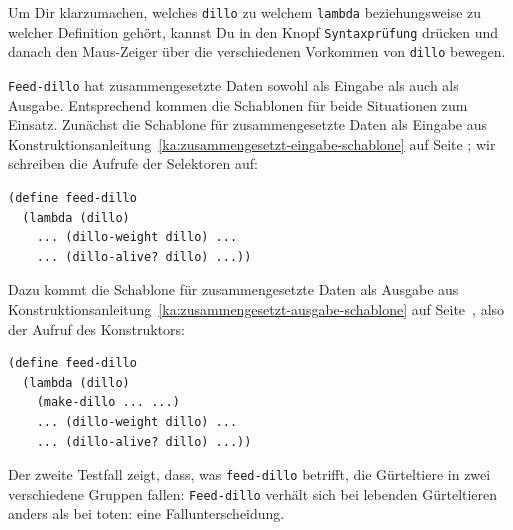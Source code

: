 \begin{aufgabeinline}
  Um Dir klarzumachen, welches \lstinline{dillo} zu welchem
  \lstinline{lambda} beziehungsweise zu welcher Definition gehört, kannst
  Du in \drscheme{} den Knopf \lstinline{Syntaxprüfung} drücken und
  danach den Maus-Zeiger über die verschiedenen Vorkommen von
  \lstinline{dillo} bewegen.
\end{aufgabeinline}
%
\lstinline{Feed-dillo} hat zusammengesetzte Daten sowohl als Eingabe
als auch als Ausgabe.  Entsprechend kommen die Schablonen für beide
Situationen zum Einsatz.  Zunächst die Schablone für zusammengesetzte
Daten als Eingabe aus
Konstruktionsanleitung~\ref{ka:zusammengesetzt-eingabe-schablone} auf
Seite \pageref{ka:zusammengesetzt-eingabe-schablone}; wir schreiben die Aufrufe der Selektoren auf:
%
\begin{lstlisting}
(define feed-dillo
  (lambda (dillo)
    ... (dillo-weight dillo) ...
    ... (dillo-alive? dillo) ...))
\end{lstlisting}
%
Dazu kommt die Schablone für zusammengesetzte Daten als Ausgabe aus
Konstruktionsanleitung~\ref{ka:zusammengesetzt-ausgabe-schablone} auf
Seite~\pageref{ka:zusammengesetzt-ausgabe-schablone}, also
der Aufruf des Konstruktors:
%
\begin{lstlisting}
(define feed-dillo
  (lambda (dillo)
    (make-dillo ... ...)
    ... (dillo-weight dillo) ...
    ... (dillo-alive? dillo) ...))
\end{lstlisting}
%
Der zweite Testfall zeigt, dass, was \lstinline{feed-dillo}
betrifft, die Gürteltiere in zwei verschiedene Gruppen fallen:
\lstinline{Feed-dillo} verhält sich bei lebenden Gürteltieren anders als
bei toten: eine Fallunterscheidung.

